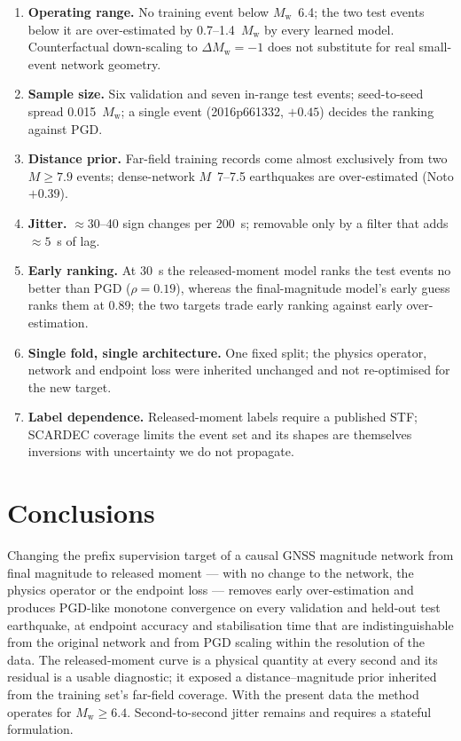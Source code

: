 \documentclass[12pt,letterpaper]{article}
\newcommand{\Mw}{M_{\mathrm{w}}}
\begin{document}
\begin{enumerate}
\item \textbf{Operating range.} No training event below $\Mw$~6.4; the two test events below it are over-estimated by 0.7--1.4~$\Mw$ by every learned model. Counterfactual down-scaling to $\Delta\Mw=-1$ does not substitute for real small-event network geometry.
\item \textbf{Sample size.} Six validation and seven in-range test events; seed-to-seed spread 0.015~$\Mw$; a single event (2016p661332, $+0.45$) decides the ranking against PGD.
\item \textbf{Distance prior.} Far-field training records come almost exclusively from two $M\geq7.9$ events; dense-network $M$~7--7.5 earthquakes are over-estimated (Noto $+0.39$).
\item \textbf{Jitter.} $\approx$30--40 sign changes per 200~s; removable only by a filter that adds $\approx5$~s of lag.
\item \textbf{Early ranking.} At 30~s the released-moment model ranks the test events no better than PGD ($\rho=0.19$), whereas the final-magnitude model's early guess ranks them at 0.89; the two targets trade early ranking against early over-estimation.
\item \textbf{Single fold, single architecture.} One fixed split; the physics operator, network and endpoint loss were inherited unchanged and not re-optimised for the new target.
\item \textbf{Label dependence.} Released-moment labels require a published STF; SCARDEC coverage limits the event set and its shapes are themselves inversions with uncertainty we do not propagate.
\end{enumerate}

\section{Conclusions}

Changing the prefix supervision target of a causal GNSS magnitude network from final magnitude to released moment --- with no change to the network, the physics operator or the endpoint loss --- removes early over-estimation and produces PGD-like monotone convergence on every validation and held-out test earthquake, at endpoint accuracy and stabilisation time that are indistinguishable from the original network and from PGD scaling within the resolution of the data. The released-moment curve is a physical quantity at every second and its residual is a usable diagnostic; it exposed a distance--magnitude prior inherited from the training set's far-field coverage. With the present data the method operates for $\Mw\geq6.4$. Second-to-second jitter remains and requires a stateful formulation.
\end{document}
